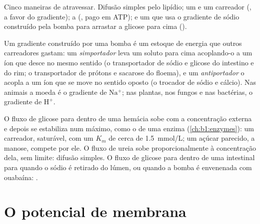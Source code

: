 \begin{omfigure}
{\small Cinco maneiras de atravessar. Difusão simples pelo lipídio; um
 e um carreador (, a favor do gradiente); a  (, pago em ATP); e um
 que usa o gradiente de sódio construído pela bomba para
arrastar a glicose para cima ().}
\end{omfigure}

\begin{proposition}\label{prop:b1:membranes-transport:secondary}
Um gradiente construído por uma bomba é um estoque de energia que outros
carreadores gastam: um \emph{simportador} leva um
soluto para cima acoplando-o a um íon que desce no mesmo sentido (o
transportador de sódio e glicose do intestino e do rim; o transportador
de prótons e sacarose do floema), e um
\emph{antiportador} o acopla a um íon que se move no
sentido oposto (o trocador de sódio e cálcio). Nas  animais a
moeda é o gradiente de $\mathrm{Na^+}$; nas plantas, nos fungos e nas
bactérias, o gradiente de $\mathrm{H^+}$.
\end{proposition}

\begin{example}\label{ex:b1:membranes-transport:kinetics}
O fluxo de glicose para dentro de uma hemácia sobe com a concentração
externa e depois se estabiliza num máximo, como o de uma enzima
(\cref{ch:b1:enzymes}): um carreador, saturável, com um $K_m$ de cerca
de \qty{1.5}{mmol/L}; um açúcar parecido, a manose, compete por ele. O
fluxo de ureia sobe proporcionalmente à concentração dela, sem limite:
difusão simples. O fluxo de glicose para dentro de uma  intestinal
para quando o sódio é retirado do lúmen, ou quando a bomba é envenenada
com ouabaína: .
\end{example}

\section{O potencial de membrana}

